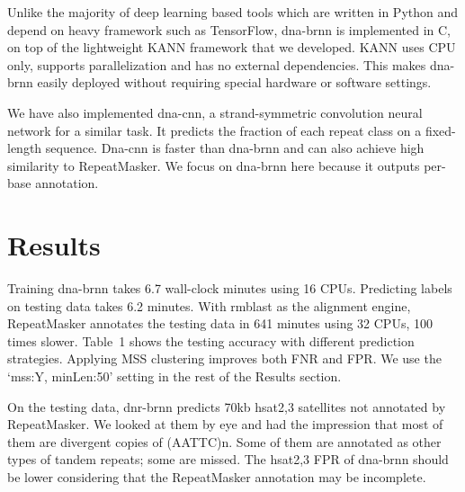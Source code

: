\documentclass{bioinfo}
\begin{document}
\begin{methods}
Unlike the majority of deep learning based tools which are written in Python
and depend on heavy framework such as TensorFlow, dna-brnn is implemented in C,
on top of the lightweight KANN framework that we developed. KANN uses CPU only, supports
parallelization and has no external dependencies. This makes dna-brnn easily
deployed without requiring special hardware or software settings.

We have also implemented dna-cnn, a strand-symmetric convolution neural network
for a similar task. It predicts the fraction of each repeat class on a
fixed-length sequence. Dna-cnn is faster than dna-brnn and can also achieve
high similarity to RepeatMasker. We focus on dna-brnn here because it outputs
per-base annotation.

\end{methods}

\section{Results}

Training dna-brnn takes 6.7 wall-clock minutes using 16 CPUs. Predicting labels
on testing data takes 6.2 minutes.
With rmblast as the alignment engine, RepeatMasker annotates the testing data in
641 minutes using 32 CPUs, 100 times slower. Table~1 shows the testing accuracy
with different prediction strategies. Applying MSS clustering improves both FNR
and FPR. We use the `mss:Y, minLen:50' setting in the rest of the Results
section.

On the testing data, dnr-brnn predicts 70kb hsat2,3 satellites not annotated
by RepeatMasker. We looked at them by eye and had the impression that most of
them are divergent copies of (AATTC)n. Some of them are annotated as other
types of tandem repeats; some are missed. The hsat2,3 FPR of dna-brnn should be
lower considering that the RepeatMasker annotation may be incomplete.
\end{document}
